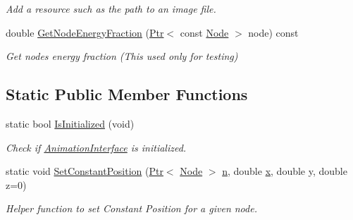 \begin{DoxyCompactItemize}
\begin{DoxyCompactList}\small\item\em Add a resource such as the path to an image file. \end{DoxyCompactList}\item 
double \hyperlink{classns3_1_1AnimationInterface_a13a230e920b38fa40eae5976c5615bce}{Get\+Node\+Energy\+Fraction} (\hyperlink{classns3_1_1Ptr}{Ptr}$<$ const \hyperlink{classns3_1_1Node}{Node} $>$ node) const 
\begin{DoxyCompactList}\small\item\em Get node\textquotesingle{}s energy fraction (This used only for testing) \end{DoxyCompactList}\end{DoxyCompactItemize}
\subsection*{Static Public Member Functions}
\begin{DoxyCompactItemize}
\item 
static bool \hyperlink{classns3_1_1AnimationInterface_ac684d112d7a69af096f070354e052809}{Is\+Initialized} (void)
\begin{DoxyCompactList}\small\item\em Check if \hyperlink{classns3_1_1AnimationInterface}{Animation\+Interface} is initialized. \end{DoxyCompactList}\item 
static void \hyperlink{classns3_1_1AnimationInterface_adc75e56ec42c4b86b90b34f04cf52ee1}{Set\+Constant\+Position} (\hyperlink{classns3_1_1Ptr}{Ptr}$<$ \hyperlink{classns3_1_1Node}{Node} $>$ \hyperlink{lte__link__budget__x2__handover__measures_8m_abdb05bc5a064cf642a06c83b3392f148}{n}, double \hyperlink{lte__link__budget__x2__handover__measures_8m_a9336ebf25087d91c818ee6e9ec29f8c1}{x}, double y, double z=0)
\begin{DoxyCompactList}\small\item\em Helper function to set Constant Position for a given node. \end{DoxyCompactList}\end{DoxyCompactItemize}
